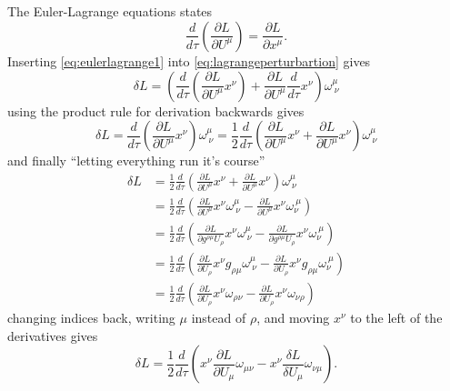 \documentclass[11pt]{amsart}
\begin{document}
\subsection{}
The Euler-Lagrange equations states
\begin{equation}
\label{eq:eulerlagrange1}
\frac{d}{d\tau}\left(\frac{\partial L}{\partial U^\mu} \right) = \frac{\partial L}{\partial x^\mu}.
\end{equation}
Inserting \ref{eq:eulerlagrange1} into \ref{eq:lagrangeperturbartion} gives
\begin{equation}
\delta L = \left(\frac{d}{d\tau}\left(\frac{\partial L}{\partial U^\mu}x^\nu \right) + \frac{\partial L}{\partial U^\mu}\frac{d}{d\tau}x^\nu \right)\omega^\mu_{\ \nu}
\end{equation}
using the product rule for derivation backwards gives
\begin{equation}
\delta L = \frac{d}{d\tau}\left(\frac{\partial L}{\partial U^\mu}x^\nu \right)\omega^\mu_{\ \nu} 
= \frac{1}{2}\frac{d}{d\tau}\left(\frac{\partial L}{\partial U^\mu}x^\nu + \frac{\partial L}{\partial U^\mu}x^\nu \right)\omega^\mu_{\ \nu}
\end{equation}
and finally ``letting everything run it's course''
\begin{align*}
\delta L &= \frac{1}{2}\frac{d}{d\tau}\left(\frac{\partial L}{\partial U^\mu}x^\nu + \frac{\partial L}{\partial U^\mu}x^\nu \right)\omega^\mu_{\ \nu} \\
		&= \frac{1}{2}\frac{d}{d\tau}\left(\frac{\partial L}{\partial U^\mu}x^\nu \omega^\mu_{\ \nu} -\frac{\partial L}{\partial U^\mu}x^\nu\omega_\nu^{\ \mu} \right) \\
		&= \frac{1}{2}\frac{d}{d\tau}\left(\frac{\partial L}{\partial g^{\rho\mu}U_\rho}x^\nu \omega^\mu_{\ \nu} -\frac{\partial L}{\partial g^{\rho\mu}U_\rho}x^\nu\omega_\nu^{\ \mu} \right) \\
		&= \frac{1}{2}\frac{d}{d\tau}\left(\frac{\partial L}{\partial U_\rho}x^\nu g_{\rho\mu} \omega^\mu_{\ \nu} -\frac{\partial L}{\partial U_\rho}x^\nu g_{\rho\mu}\omega_\nu^{\ \mu} \right) \\
		&= \frac{1}{2}\frac{d}{d\tau}\left(\frac{\partial L}{\partial U_\rho}x^\nu  \omega_{\rho\nu} -\frac{\partial L}{\partial U_\rho}x^\nu \omega_{\nu\rho} \right)		
\end{align*} 
changing indices back, writing $\mu$ instead of $\rho$, and moving $x^\nu$ to the left of the derivatives gives
\begin{equation*}
\delta L = \frac{1}{2}\frac{d}{d\tau}\left(x^\nu\frac{\partial L}{\partial U_\mu}  \omega_{\mu\nu} - x^\nu\frac{\delta L}{\delta U_\mu} \omega_{\nu\mu} \right).		
\end{equation*}
\end{document}
